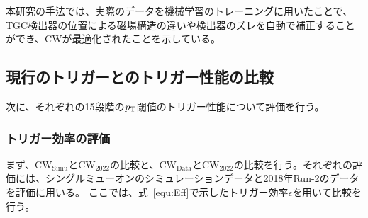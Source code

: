 本研究の手法では、実際のデータを機械学習のトレーニングに用いたことで、TGC検出器の位置による磁場構造の違いや検出器のズレを自動で補正することができ、CWが最適化されたことを示している。


\subsection{現行のトリガーとのトリガー性能の比較}
次に、それぞれの15段階の$p_{\rm{T}}$閾値のトリガー性能について評価を行う。

\subsubsection{トリガー効率の評価}
まず、$\mathrm{CW_{Simu}}$と$\mathrm{CW_{2022}}$の比較と、$\mathrm{CW_{Data}}$と$\mathrm{CW_{2022}}$の比較を行う。それぞれの評価には、シングルミューオンのシミュレーションデータと2018年Run-2のデータを評価に用いる。
ここでは、式~\ref{equ:Eff}で示したトリガー効率$\epsilon$を用いて比較を行う。

